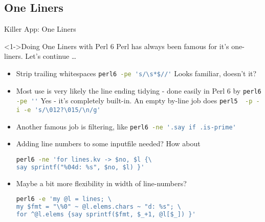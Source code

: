 \subsection{One Liners}

\begin{frame}[fragile]{Killer App: One Liners}
\begin{block}<1->{Doing One Liners with Perl 6}
Perl has always been famous for it's one-liners. Let's continue \ldots
\begin{itemize}
\item<1-> Strip trailing whitespaces \lstinline[language=sh,inputencoding=latin9]!perl6 -pe 's/\s*$//'!
Looks familiar, doesn't it?
\item<2-> Most use is very likely the line ending tidying - done easily in Perl 6 by \lstinline[language=sh,inputencoding=latin9]!perl6 -pe ''!
Yes - it's completely built-in. An empty by-line job does \lstinline[language=sh,inputencoding=latin9]!perl5  -p -i -e 's/\012?\015/\n/g'!
\item<3-> Another famous job is filtering, like \lstinline[language=sh,inputencoding=latin9]!perl6 -ne '.say if .is-prime'!
\item<4-> Adding line numbers to some inputfile needed? How about
\begin{lstlisting}[language=sh,inputencoding=latin9]
perl6 -ne 'for lines.kv -> $no, $l {\
say sprintf("%04d: %s", $no, $l) }'
\end{lstlisting}
\item<5-> Maybe a bit more flexibility in width of line-numbers?
\begin{lstlisting}[language=sh,inputencoding=latin9]
perl6 -e 'my @l = lines; \
my $fmt = "\%0" ~ @l.elems.chars ~ "d: %s"; \
for ^@l.elems {say sprintf($fmt, $_+1, @l[$_]) }'
\end{lstlisting}
\end{itemize}
\end{block}
\end{frame}


